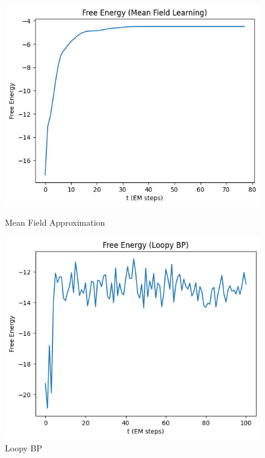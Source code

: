 \documentclass[12pt]{article}
\begin{document}
\begin{figure}[h]
\centering
\begin{minipage}{.5\textwidth}
  \centering
\includegraphics[scale=0.4]{outputs/q3/f-free-energy}
\caption{Mean Field Approximation}
\label{fig:3g-free-energy-diff-sigma}
\end{minipage}%
\begin{minipage}{.5\textwidth}
  \centering
\includegraphics[scale=0.4]{outputs/q6/all-free-energy}
\caption{Loopy BP}
\label{fig:3g-free-energy-diff-sigma}
\end{minipage}
\end{figure}
\end{document}
